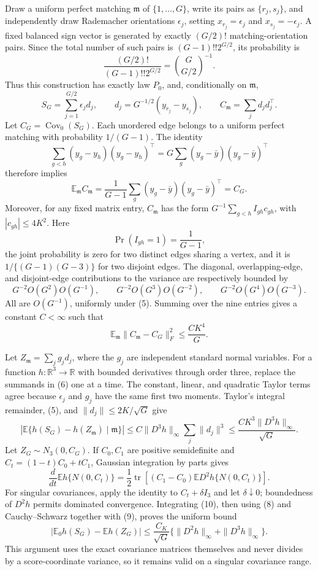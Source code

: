 Draw a uniform perfect matching \(\mathfrak m\) of \(\{1,\ldots,G\}\), write its pairs as \(\{r_j,s_j\}\), and independently draw Rademacher orientations \(\epsilon_j\), setting \(x_{r_j}=\epsilon_j\) and \(x_{s_j}=-\epsilon_j\).  A fixed balanced sign vector is generated by exactly \((G/2)!\) matching-orientation pairs.  Since the total number of such pairs is \((G-1)!!2^{G/2}\), its probability is
\[
\frac{(G/2)!}{(G-1)!!2^{G/2}}=\binom{G}{G/2}^{-1}.
\]
Thus this construction has exactly law \(P_0\), and, conditionally on \(\mathfrak m\),
\[
S_G=\sum_{j=1}^{G/2}\epsilon_jd_j,
\qquad
d_j=G^{-1/2}(y_{r_j}-y_{s_j}),
\qquad
C_{\mathfrak m}=\sum_jd_jd_j^\top.                       \tag{6}
\]
Let \(C_G=\operatorname{Cov}_0(S_G)\).  Each unordered edge belongs to a uniform perfect matching with probability \(1/(G-1)\).  The identity
\[
\sum_{g<h}(y_g-y_h)(y_g-y_h)^\top
=G\sum_g(y_g-\bar y)(y_g-\bar y)^\top
\]
therefore implies
\[
\mathbb E_{\mathfrak m}C_{\mathfrak m}
=\frac1{G-1}\sum_g(y_g-\bar y)(y_g-\bar y)^\top=C_G.    \tag{7}
\]
Moreover, for any fixed matrix entry, \(C_{\mathfrak m}\) has the form \(G^{-1}\sum_{g<h}I_{gh}c_{gh}\), with \(|c_{gh}|\leq4K^2\).  Here
\[
\Pr(I_{gh}=1)=\frac1{G-1},
\]
the joint probability is zero for two distinct edges sharing a vertex, and it is \(1/\{(G-1)(G-3)\}\) for two disjoint edges.  The diagonal, overlapping-edge, and disjoint-edge contributions to the variance are respectively bounded by
\[
G^{-2}O(G^2)O(G^{-1}),\qquad
G^{-2}O(G^3)O(G^{-2}),\qquad
G^{-2}O(G^4)O(G^{-3}).
\]
All are \(O(G^{-1})\), uniformly under (5).  Summing over the nine entries gives a constant \(C<\infty\) such that
\[
\mathbb E_{\mathfrak m}\|C_{\mathfrak m}-C_G\|_F^2
\leq \frac{CK^4}{G}.                                     \tag{8}
\]

Let \(Z_{\mathfrak m}=\sum_jg_jd_j\), where the \(g_j\) are independent standard normal variables.  For a function \(h:\mathbb R^3\to\mathbb R\) with bounded derivatives through order three, replace the summands in (6) one at a time.  The constant, linear, and quadratic Taylor terms agree because \(\epsilon_j\) and \(g_j\) have the same first two moments.  Taylor's integral remainder, (5), and \(\|d_j\|\leq2K/\sqrt G\) give
\[
\left|\mathbb E\{h(S_G)-h(Z_{\mathfrak m})\mid\mathfrak m\}\right|
\leq C\|D^3h\|_\infty\sum_j\|d_j\|^3
\leq \frac{CK^3\|D^3h\|_\infty}{\sqrt G}.              \tag{9}
\]
Let \(Z_G\sim N_3(0,C_G)\).  If \(C_0,C_1\) are positive semidefinite and \(C_t=(1-t)C_0+tC_1\), Gaussian integration by parts gives
\[
\frac{d}{dt}\mathbb Eh\{N(0,C_t)\}
=\frac12\operatorname{tr}\left[(C_1-C_0)
                 \mathbb ED^2h\{N(0,C_t)\}\right].      \tag{10}
\]
For singular covariances, apply the identity to \(C_t+\delta I_3\) and let \(\delta\downarrow0\); boundedness of \(D^2h\) permits dominated convergence.  Integrating (10), then using (8) and Cauchy--Schwarz together with (9), proves the uniform bound
\[
\left|\mathbb E_0h(S_G)-\mathbb Eh(Z_G)\right|
\leq\frac{C_K}{\sqrt G}
 \{\|D^2h\|_\infty+\|D^3h\|_\infty\}.                 \tag{11}
\]
This argument uses the exact covariance matrices themselves and never divides by a score-coordinate variance, so it remains valid on a singular covariance range.

